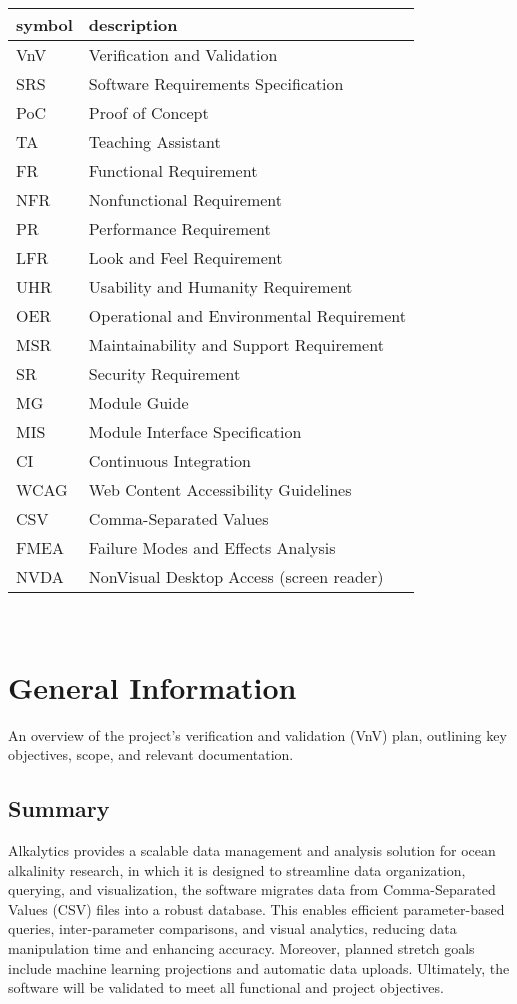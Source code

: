 \documentclass[12pt, titlepage]{article}
\begin{document}
\renewcommand{\arraystretch}{1.2}\begin{tabular}{l l} 
  \toprule		
  \textbf{symbol} & \textbf{description}\\
  \midrule 
  VnV & Verification and Validation\\
  SRS & Software Requirements Specification\\
  PoC & Proof of Concept\\
  TA & Teaching Assistant\\
  FR & Functional Requirement\\
  NFR & Nonfunctional Requirement\\
  PR & Performance Requirement\\
  LFR & Look and Feel Requirement\\
  UHR & Usability and Humanity Requirement\\
  OER & Operational and Environmental Requirement\\
  MSR & Maintainability and Support Requirement\\
  SR & Security Requirement\\
  MG & Module Guide\\
  MIS & Module Interface Specification\\
  CI & Continuous Integration\\
  WCAG & Web Content Accessibility Guidelines\\
  CSV & Comma-Separated Values\\
  FMEA & Failure Modes and Effects Analysis\\
  NVDA & NonVisual Desktop Access (screen reader)\\
  \bottomrule
\end{tabular}\\


\newpage


\section{General Information}
An overview of the project's verification and validation (VnV) plan, outlining
key objectives, scope, and relevant documentation.
\subsection{Summary}

Alkalytics provides a scalable data management and analysis solution for ocean
alkalinity research, in which it is designed to streamline data organization,
querying, and visualization, the software migrates data from Comma-Separated
Values (CSV) files into a robust database. This enables efficient
parameter-based queries, inter-parameter comparisons, and visual analytics,
reducing data manipulation time and enhancing accuracy. Moreover, planned
stretch goals include machine learning projections and automatic data uploads.
Ultimately, the software will be validated to meet all functional and project
objectives.
\end{document}
